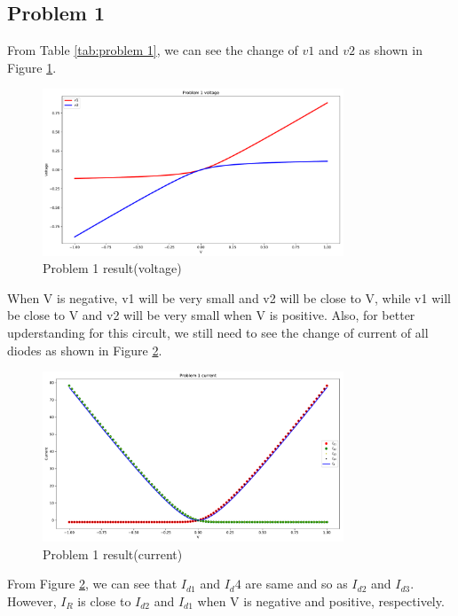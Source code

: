 \documentclass{article}
\begin{document}
\subsection{Problem 1}
From Table \ref{tab:problem 1}, we can see the change of $v1$ and $v2$ as shown in Figure \ref{fig:M1 volt}.
\begin{figure}[H]
    \centering
    \includegraphics[width=0.8\textwidth]{src/M1_voltage.pdf}
    \caption{Problem 1 result(voltage)}
    \label{fig:M1 volt}
\end{figure}
When V is negative, v1 will be very small and v2 will be close to V, while v1 will be close to V and v2 will be very small when V is positive.
Also, for better upderstanding for this circult, we still need to see the change of current of all diodes as shown in Figure \ref{fig:M1 current}.
\begin{figure}[H]
    \centering
    \includegraphics[width=0.8\textwidth]{src/M1_current.pdf}
    \caption{Problem 1 result(current)}
    \label{fig:M1 current}
\end{figure}
From Figure \ref{fig:M1 current}, we can see that $I_{d1}$ and $I_d{4}$ are same and so as $I_{d2}$ and $I_{d3}$. However, $I_R$ is close to 
$I_{d2}$ and $I_{d1}$ when V is negative and positive, respectively.
\end{document}
